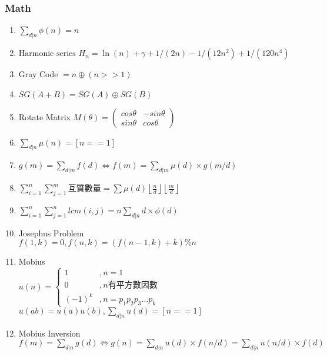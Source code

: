 \subsubsection{Math}
\begin{enumerate}\itemsep = -3pt
\item $\sum_{d|n} \phi(n) = n$
\item $\text{Harmonic series } H_n = \ln(n) + \gamma + 1/(2n) - 1/(12n^2) + 1/(120n^4)$
\item Gray Code $=n\oplus (n>>1)$
\item $SG(A+B)=SG(A)\oplus SG(B)$
\item Rotate Matrix $M(\theta)= \left( \begin{array}{ccc}
cos\theta & -sin\theta \\ 
sin\theta &  cos\theta
\end{array} \right)$
\item $\sum_{d|n} \mu (n)=[n==1]$
\item $g(m)=\sum_{d|m}f(d)\Leftrightarrow f(m)=\sum_{d|m}\mu (d) \times g(m/d)$
\item $\sum_{i=1}^n\sum_{j=1}^m$互質數量$=\sum \mu (d)\left \lfloor \frac{n}{d} \right \rfloor \left \lfloor \frac{m}{d} \right \rfloor$
\item $\sum_{i=1}^n\sum_{j=1}^nlcm(i,j)=n\sum_{d|n} d \times \phi (d)$
\item Josephus Problem\\
$f(1,k) = 0, f(n, k) = (f(n-1,k)+k) \% n$
\item Mobius\\
$u(n) = \begin{cases}
1 &, n = 1\\
0 &, n \text{有平方數因數}\\
(-1)^k &, n = p_1 p_2 p_3 \dots p_k
\end{cases}$\\
$u(ab) = u(a)u(b), \sum_{d | n} u(d) = [n == 1]$
\item Mobius Inversion\\
$f(m)=\sum_{d|n}g(d)\Leftrightarrow g(n)=\sum_{d|n} u(d) \times f(n/d) = \sum_{d|n} u(n/d) \times f(d) $


\end{enumerate}
